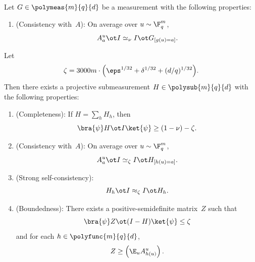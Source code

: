\begin{theorem}\label{thm:self-improvement}
  \leanok
  Let $G \in \polymeas{m}{q}{d}$ be a measurement with the following properties:
  \begin{enumerate}
    \item (Consistency with~$A$): \label{item:self-improvement-projective-G-consistency} On average over $u \sim \F_q^{m}$,
    \[
      A^{u}_a \ot I \simeq_{\nu} I \ot G_{[g(u)=a]}.
    \]
  \end{enumerate}
  Let
  \[
    \zeta = 3000m\cdot \Big(\eps^{1/32} + \delta^{1/32} + (d/q)^{1/32}\Big).
  \]
  Then there exists a projective submeasurement $H \in \polysub{m}{q}{d}$ with the following properties:
  \begin{enumerate}
    \item (Completeness): \label{item:self-improvement-projective-completeness} If $H = \sum_h H_h$, then
    \[
      \bra{\psi} H \ot I \ket{\psi} \geq (1-\nu)-\zeta.
    \]
    \item (Consistency with~$A$): \label{item:self-improvement-projective-A-consistency} On average over $u \sim \F_q^m$,
    \[
      A^u_a \ot I \simeq_{\zeta} I \ot H_{[h(u) = a]}.
    \]
    \item (Strong self-consistency): \label{item:self-improvement-projective-self}
    \[
      H_h \ot I \approx_{\zeta} I \ot H_h.
    \]
    \item (Boundedness): \label{item:self-improvement-projective-boundedness} There exists a positive-semidefinite matrix~$Z$ such that
    \[
      \bra{\psi} Z \ot (I - H) \ket{\psi} \leq \zeta
    \]
    and for each $h \in \polyfunc{m}{q}{d}$,
    \[
      Z \geq \left(\E_{u} A^{u}_{h(u)}\right).
    \]
  \end{enumerate}
\end{theorem}
